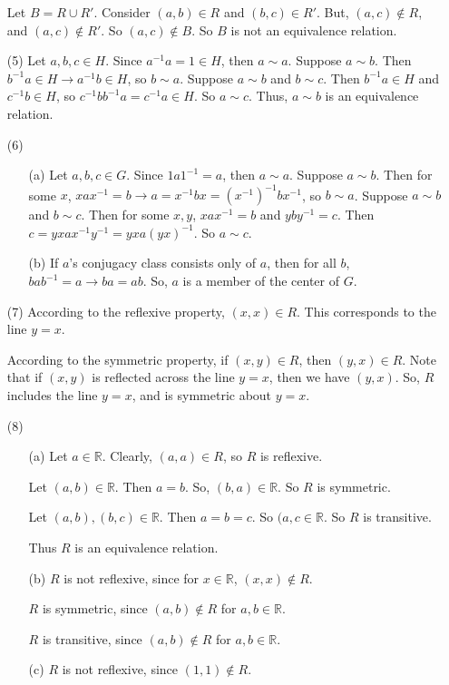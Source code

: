 \documentclass[12pt]{article}
\begin{document}
\begin{itemize}
Let $B = R \cup R'$. Consider $(a, b) \in R$ and $(b, c) \in R'$. But, $(a, c) \not \in R$, and $(a, c) \not \in R'$. So $(a, c) \not \in B$. So $B$ is not an equivalence relation.
\item[(5)]
Let $a, b, c \in H$. Since $a^{-1}a = 1 \in H$, then $a \sim a$. Suppose $a \sim b$. Then $b^{-1}a \in H \rightarrow a^{-1}b \in H$, so $b \sim a$. Suppose $a \sim b$ and $b \sim c$. Then $b^{-1}a \in H$ and $c^{-1}b \in H$, so $c^{-1}bb^{-1}a = c^{-1}a \in H$. So $a \sim c$. Thus, $a \sim b$ is an equivalence relation.
\item[(6)]
\begin{itemize}
\item[(a)]
Let $a, b, c \in G$. Since $1a1^{-1} = a$, then $a \sim a$. Suppose $a \sim b$. Then for some $x$, $xax^{-1} = b \rightarrow a = x^{-1}bx = (x^{-1})^{-1}bx^{-1}$, so $b \sim a$. Suppose $a \sim b$ and $b \sim c$. Then for some $x, y$, $xax^{-1} = b$ and $yby^{-1} = c$. Then $c = yxax^{-1}y^{-1} = yxa(yx)^{-1}$. So $a \sim c$. 
\item[(b)]
If $a$'s conjugacy class consists only of $a$, then for all $b$, $bab^{-1} = a \rightarrow ba = ab$. So, $a$ is a member of the center of $G$.
\end{itemize}
\item[(7)]
According to the reflexive property, $(x, x) \in R$. This corresponds to the line $y = x$.

According to the symmetric property, if $(x, y) \in R$, then $(y, x) \in R$. Note that if $(x, y)$ is reflected across the line $y = x$, then we have $(y, x)$. So, $R$ includes the line $y = x$, and is symmetric about $y = x$.
\item[(8)]
\begin{itemize}
\item[(a)]
Let $a \in \mathbb{R}$. Clearly, $(a, a) \in R$, so $R$ is reflexive. 

Let $(a, b) \in \mathbb{R}$. Then $a = b$. So, $(b, a) \in \mathbb{R}$. So $R$ is symmetric. 

Let $(a, b), (b, c) \in \mathbb{R}$. Then $a = b = c$. So $(a, c \in \mathbb{R}$. So $R$ is transitive. 

Thus $R$ is an equivalence relation.
\item[(b)]
$R$ is not reflexive, since for $x \in \mathbb{R}$, $(x, x) \not \in R$.

$R$ is symmetric, since $(a, b) \not \in R$ for $a, b \in \mathbb{R}$.

$R$ is transitive, since $(a, b) \not \in R$ for $a, b \in \mathbb{R}$.
\item[(c)]
$R$ is not reflexive, since $(1, 1) \not \in R$.


\end{itemize}
\end{itemize}
\end{document}
